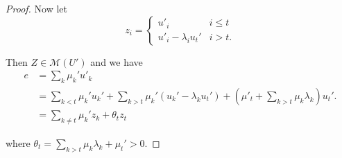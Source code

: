 \documentclass[10pt,a4paper]{amsart}
\newcommand{\cM}{\mathcal{M}}
\begin{document}
\begin{proof}
Now let 
$$z_i = \begin{cases}
    u'_i & i\leq t \\
    u'_i - \lambda_iu_t' & i>t.
\end{cases} $$

Then $Z\in \cM(U')$ and we have
\begin{align*}
    e &= \sum_k \mu_k'u'_k \\
    &= \sum_{k<t} \mu_k'u_k'+ \sum_{k>t} \mu_k'(u_k'- \lambda_k u_t') + \left(\mu'_t+\sum_{k> t}\mu_k\lambda_k\right) u_t'. \\
    & = \sum_{k\neq t} \mu_k' z_k + \theta_t z_t
\end{align*}

where $\theta_t = \sum_{k>t}\mu_k\lambda_k + \mu_t' > 0$. 
\end{proof}
\end{document}
